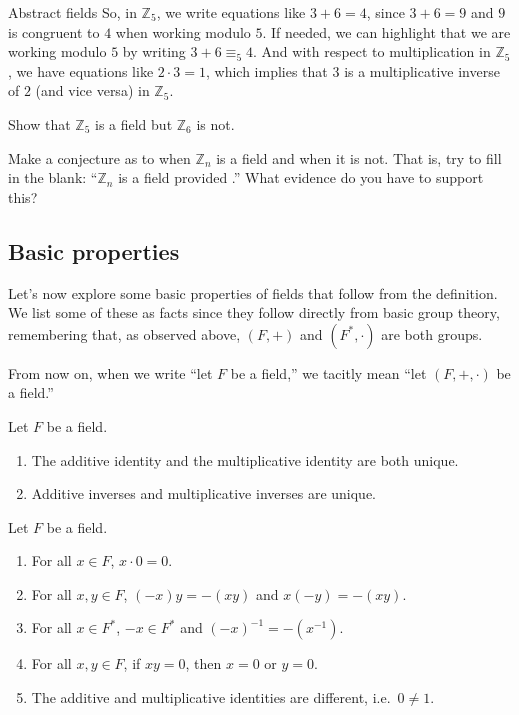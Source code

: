 \begin{section}{Abstract fields}
So, in $\mathbb{Z}_5$, we write equations like $3+6 = 4$, since $3+6 = 9$ and $9$ is congruent to $4$ when working modulo $5$. If needed, we can highlight that we are working modulo $5$ by writing  $3+6 \equiv_5 4$. And with respect to multiplication in $\mathbb{Z}_5$, we have equations like $2\cdot3 = 1$, which implies that $3$ is a multiplicative inverse of $2$ (and vice versa) in $\mathbb{Z}_5$.

\begin{problem}
Show that $\mathbb{Z}_5$ is a field but $\mathbb{Z}_6$ is not.
\end{problem}

\begin{problem}\label{prob.ConjectureZn}
Make a conjecture as to when $\mathbb{Z}_n$ is a field and when it is not. That is, try to fill in the blank: ``$\mathbb{Z}_n$ is a field provided .'' What evidence do you have to support this?
\end{problem}

\subsection{Basic properties}

Let's now explore some basic properties of fields that follow from the definition. We list some of these as facts since they follow directly from basic group theory, remembering that, as observed above, $(F,+)$ and $(F^*,\cdot)$ are both groups. 

From now on, when we write ``let $F$ be a field,'' we tacitly mean ``let $(F,+,\cdot)$ be a field.''

\begin{fact}
Let $F$ be a field. 
\begin{enumerate}
\item The additive identity and the multiplicative identity are both unique.
\item Additive inverses and multiplicative inverses are unique.
\end{enumerate}
\end{fact}

\begin{theorem}\label{thm.BasicFieldProps}
Let $F$ be a field. 
\begin{enumerate}
\item For all $x\in F$, $x\cdot0 = 0$.
\item For all $x,y\in F$, $(-x)y = -(xy)$ and $x(-y) = -(xy)$.
\item For all $x\in F^*$, $-x\in F^*$ and $(-x)^{-1} = -(x^{-1})$.
\item For all $x,y\in F$, if $xy = 0$, then $x=0$ or $y=0$.
\item The additive and multiplicative identities are different, i.e.~$0\neq 1$.
\end{enumerate}
\end{theorem}


\end{section}
